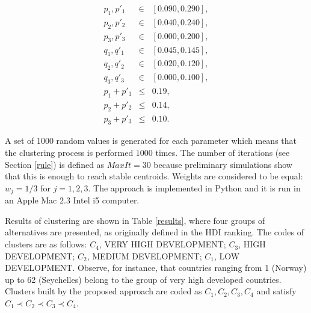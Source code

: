 \documentclass[]{elsarticle}
\theoremstyle{definition}
\begin{document}
\begin{eqnarray}
p_1,p'_1 &\in& [0.090, 0.290], \nonumber\\
p_2,p'_2 &\in& [0.040, 0.240], \nonumber\\
p_3,p'_3 &\in& [0.000, 0.200], \nonumber\\
q_1,q'_1 &\in& [0.045, 0.145], \nonumber\\
q_2,q'_2 &\in& [0.020, 0.120], \nonumber\\
q_3,q'_3 &\in& [0.000, 0.100], \nonumber\\
p_1+p'_1 &\leq& 0.19, \nonumber\\
p_2+p'_2 &\leq& 0.14,  \nonumber\\
p_3+p'_3 &\leq& 0.10. \nonumber
\end{eqnarray}


\noindent
A set of 1000 random values is generated for each parameter which means that the clustering process is performed $1000$ times.  The number of iterations (see Section \ref{rule}) is defined as $MaxIt=30$ because preliminary simulations show that this is enough to reach stable centroids.  Weights are considered to be equal: $w_j=1/3$ for $j=1,2,3$. The  approach is implemented in Python and it is run in an Apple Mac 2.3 Intel i5 computer.

Results of clustering are shown in Table \ref{results}, where four groups of alternatives  are presented, as originally defined in the HDI ranking.  The codes of clusters are as follows: $C_4$, VERY HIGH DEVELOPMENT; $C_3$,  HIGH DEVELOPMENT;  $C_2$, MEDIUM DEVELOPMENT; $C_1$, LOW DEVELOPMENT.  Observe, for instance, that countries ranging from  1 (Norway) up to 62 (Seychelles) belong to the group of very high developed countries. Clusters built by the proposed approach are coded as $C_1, C_2, C_3, C_4$ and satisfy $C_1 \prec  C_2 \prec C_3 \prec C_4$.  




\newcommand\items{4}   %
\end{document}
